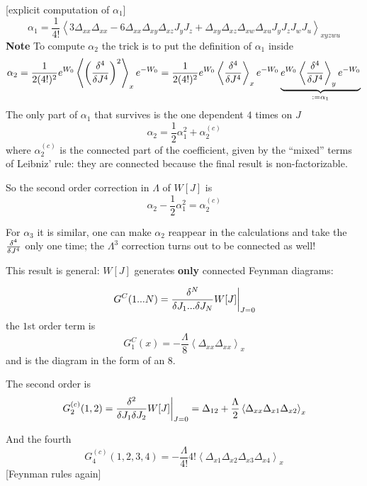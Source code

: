 
[explicit computation of $\alpha_1$]\\

\[
    \alpha_1 = \frac{1}{4!} \left\langle 
        3\Delta _{xx}\Delta_{xx}-6\Delta _{xx}\Delta_{xy}\Delta_{xz}J_yJ_z+
        \Delta_{xy}\Delta_{xz}\Delta_{xw}\Delta_{xu}J_yJ_zJ_wJ_u
    \right\rangle_{xyzwu}
\]
\textbf{Note} To compute $\alpha _2$ the trick is to put the definition of
$\alpha _1$ inside 
\[
    \alpha_2 = \frac{1}{2(4!)^2}e^{W_0}\left\langle \left(\fdv[4]{}{J}\right)^2
    \right\rangle_xe^{-W_0}=
    \frac{1}{2(4!)^2}e^{W_0}\left\langle\fdv[4]{}{J}\right\rangle_xe^{-W_0}
    \underbrace{e^{W_0}\left\langle \fdv[4]{}{J}\right\rangle_y e^{-W_0}}_{
    :=\alpha_1}
\]
The only part of $\alpha _1$ that survives is the one dependent $4$ times on
$J$
\[
    \alpha_2 = \frac{1}{2}\alpha_1^2 + \alpha_2^{(c)}
\]
where $\alpha ^{(c)}_2$ is the connected part of the coefficient, given by
the ``mixed'' terms of Leibniz' rule: they are connected because the final
result is non-factorizable.

So the second order correction in $\Lambda $ of $W[J]$ is
\[
    \alpha_2-\frac{1}{2}\alpha_1^2 = \alpha_2^{(c)} 
\]

For $\alpha_3$ it is similar, one can make $\alpha_2$ reappear in the calculations
and take the $\fdv[4]{}{J}$ only one time; the $\Lambda^3$ correction turns
out to be connected as well!

This result is general: $W[J]$ generates \textbf{only} connected Feynman diagrams:

\[
    \eval{G^C(1...N)=\frac{\delta^N}{\delta J_1...\delta J_N}W[J]}_{J=0}
\]
the $1$st order term is
\[
  G^C_1(x) = -\frac{\Lambda }{8}\left\langle \Delta_{xx}\Delta_{xx}\right\rangle_x
\]
and is the diagram in the form of an $8$.

The second order is
\[
    \eval{G_2^{(c)}(1,2) = \frac{\delta^2}{\delta J_1\delta J_2}W[J]}_{J=0}=
    \Delta_{12} + \frac{\Lambda }{2}\left\langle\Delta_{xx}\Delta_{x1}\Delta_{x2}
    \right\rangle_x
\]

And the fourth
\[
    G_4^{(c)}(1,2,3,4) = -\frac{\Lambda }{4!}4!\left\langle \Delta_{x1}\Delta_{x2}
    \Delta_{x3}\Delta_{x4}\right\rangle_x
\]
[Feynman rules again]
